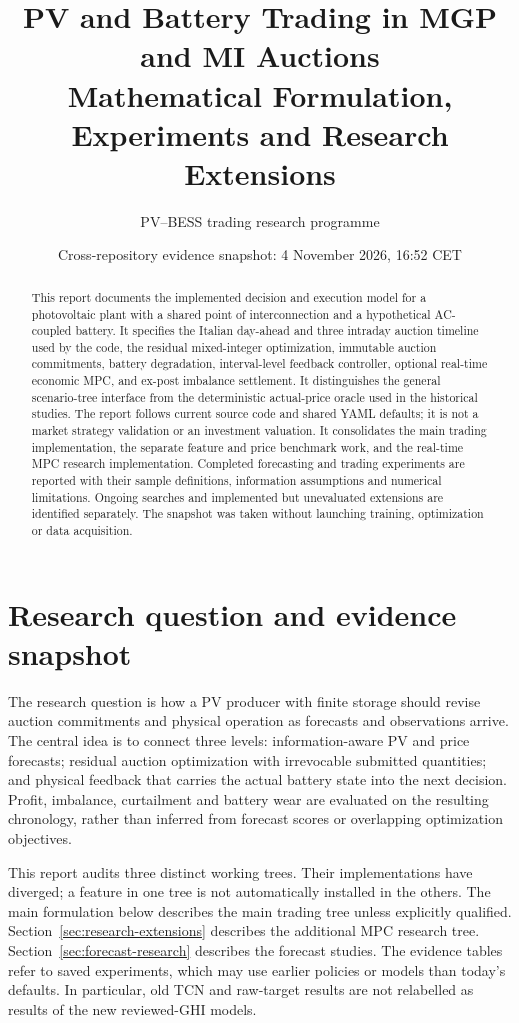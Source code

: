 \documentclass[11pt,a4paper]{article}
\title{PV and Battery Trading in MGP and MI Auctions\\Mathematical Formulation, Experiments and Research Extensions}
\author{PV--BESS trading research programme}
\date{Cross-repository evidence snapshot: 4 November 2026, 16:52 CET}
\begin{document}
\maketitle
\begin{abstract}
This report documents the implemented decision and execution model for a
photovoltaic plant with a shared point of interconnection and a hypothetical
AC-coupled battery. It specifies the Italian day-ahead and three intraday
auction timeline used by the code, the residual mixed-integer optimization,
immutable auction commitments, battery degradation, interval-level feedback
controller, optional real-time economic MPC, and ex-post imbalance settlement. It distinguishes the general
scenario-tree interface from the deterministic actual-price oracle used in the
historical studies. The report follows current source code and shared YAML
defaults; it is not a market strategy validation or an investment valuation.
It consolidates the main trading implementation, the separate feature and price
benchmark work, and the real-time MPC research implementation. Completed
forecasting and trading experiments are reported with their sample definitions,
information assumptions and numerical limitations. Ongoing searches and
implemented but unevaluated extensions are identified separately. The snapshot
was taken without launching training, optimization or data acquisition.
\end{abstract}
\tableofcontents
\newpage

\section{Research question and evidence snapshot}
The research question is how a PV producer with finite storage should revise
auction commitments and physical operation as forecasts and observations arrive.
The central idea is to connect three levels: information-aware PV and price
forecasts; residual auction optimization with irrevocable submitted quantities;
and physical feedback that carries the actual battery state into the next
decision. Profit, imbalance, curtailment and battery wear are evaluated on the
resulting chronology, rather than inferred from forecast scores or overlapping
optimization objectives.

This report audits three distinct working trees. Their implementations have
diverged; a feature in one tree is not automatically installed in the others.
The main formulation below describes the main trading tree unless explicitly
qualified. Section~\ref{sec:research-extensions} describes the additional MPC
research tree. Section~\ref{sec:forecast-research} describes the forecast studies.
The evidence tables refer to saved experiments, which may use earlier policies
or models than today's defaults. In particular, old TCN and raw-target results
are not relabelled as results of the new reviewed-GHI models.
\end{document}
